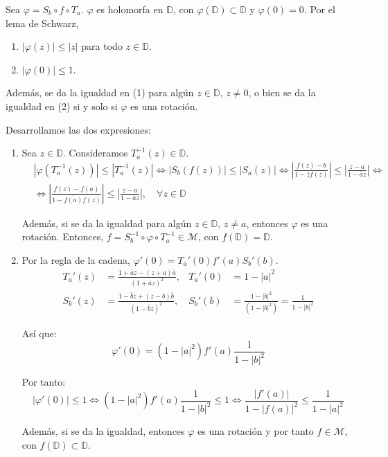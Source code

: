 Sea $\varphi = S_b \circ f \circ T_a$.
$\varphi$ es holomorfa en $\mathbb{D}$, con $\varphi(\mathbb{D}) \subset \mathbb{D}$ y $\varphi(0) = 0$.
Por el lema de Schwarz,
\begin{enumerate}
    \item $|\varphi(z)| \leq |z|$ para todo $z \in \mathbb{D}$.
    \item $|\varphi(0)| \leq 1$.
\end{enumerate}

Además, se da la igualdad en (1) para algún $z \in \mathbb{D}$, $z \neq 0$, o bien se da la igualdad en (2) si y solo si $\varphi$ es una rotación.

Desarrollamos las dos expresiones:
\begin{enumerate}
    \item Sea $z \in \mathbb{D}$.
          Consideramos $T_a^{-1}(z) \in \mathbb{D}$.
          \begin{align*}
               & |\varphi(T_a^{-1}(z))| \leq |T_a^{-1}(z)| \Leftrightarrow |S_b(f(z))| \leq |S_a(z)| \Leftrightarrow \left|\frac{f(z)-b}{1-\bar{z}f(z)}\right| \leq \left|\frac{z-a}{1-\bar{a}z}\right| \Leftrightarrow \\
               & \Leftrightarrow \left|\frac{f(z)-f(a)}{1-\overline{f(a)}f(z)}\right| \leq \left|\frac{z-a}{1-\bar{a}z}\right|, \quad \forall z \in \mathbb{D}
          \end{align*}

          Además, si se da la igualdad para algún $z \in \mathbb{D}$, $z \neq a$, entonces $\varphi$ es una rotación.
          Entonces, $f = S_b^{-1} \circ \varphi \circ T_a^{-1} \in \mathcal{M}$, con $f(\mathbb{D}) = \mathbb{D}$.

    \item Por la regla de la cadena, $\varphi'(0) = T_a'(0) f'(a) S_b'(b)$.
          \begin{align*}
              T_a'(z) & = \frac{1 + \bar{a}z - (z+a)\bar{a}}{(1 + \bar{a}z)^2}, & T_a'(0) & = 1 - |a|^2                                     \\
              S_b'(z) & = \frac{1 - \bar{b}z + (z-b)\bar{b}}{(1 - \bar{b}z)^2}, & S_b'(b) & = \frac{1-|b|^2}{(1-|b|^2)} = \frac{1}{1-|b|^2}
          \end{align*}

          Así que:
          $$\varphi'(0) = (1-|a|^2)f'(a)\frac{1}{1-|b|^2}$$

          Por tanto:
          $$|\varphi'(0)| \leq 1 \Leftrightarrow (1-|a|^2)f'(a)\frac{1}{1-|b|^2} \leq 1 \Leftrightarrow \frac{|f'(a)|}{1-|f(a)|^2} \leq \frac{1}{1-|a|^2}$$

          Además, si se da la igualdad, entonces $\varphi$ es una rotación y por tanto $f \in \mathcal{M}$, con $f(\mathbb{D}) \subset \mathbb{D}$.
\end{enumerate}

